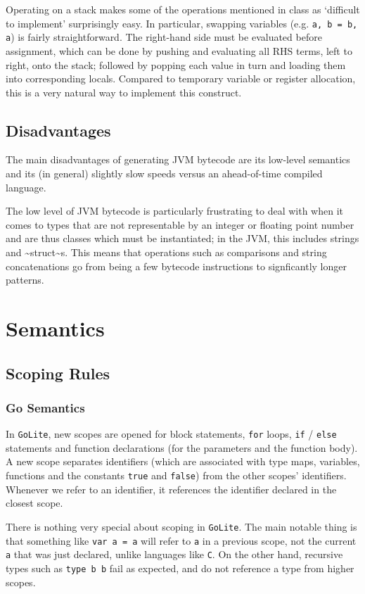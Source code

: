 \documentclass[11pt]{article}
\begin{document}
Operating on a stack makes some of the operations mentioned in class as
`difficult to implement' surprisingly easy. In particular, swapping
variables (e.g. \texttt{a, b = b, a}) is fairly straightforward. The right-hand
side must be evaluated before assignment, which can be done by pushing and
evaluating all RHS terms, left to right, onto the stack; followed by popping
each value in turn and loading them into corresponding locals. Compared to
temporary variable or register allocation, this is a very natural way to
implement this construct.

\subsection{Disadvantages}
\label{sec:orgf219382}
The main disadvantages of generating JVM bytecode are its low-level semantics
and its (in general) slightly slow speeds versus an ahead-of-time compiled
language.

The low level of JVM bytecode is particularly frustrating to deal with when
it comes to types that are not representable by an integer or floating point
number and are thus classes which must be instantiated; in the JVM, this
includes strings and \textasciitilde{}struct\textasciitilde{}s. This means that operations such as
comparisons and string concatenations go from being a few bytecode
instructions to signficantly longer patterns.
\section{Semantics}
\label{sec:org39fa905}
\subsection{Scoping Rules}
\label{sec:org0e25dc4}
\subsubsection{Go Semantics}
\label{sec:org031a643}
In \texttt{GoLite}, new scopes are opened for block statements, \texttt{for}
loops, \texttt{if} / \texttt{else} statements and function declarations (for the
parameters and the function body). A new scope separates
identifiers (which are associated with type maps, variables,
functions and the constants \texttt{true} and \texttt{false}) from the other scopes'
identifiers. Whenever we refer to an identifier, it references the
identifier declared in the closest scope.

There is nothing very special about scoping in \texttt{GoLite}. The main
notable thing is that something like \texttt{var a = a} will refer to \texttt{a}
in a previous scope, not the current \texttt{a} that was just declared,
unlike languages like \texttt{C}.
On the other hand, recursive types such as \texttt{type b b} fail as expected,
and do not reference a type from higher scopes.
\end{document}
